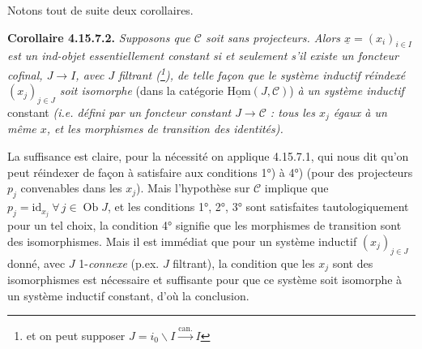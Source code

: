 \documentclass[11pt]{article}
\newcommand{\msp}[1]{\marginpar{\footnotesize [#1]}}
\newcommand{\ux}{\underline{x}}
\newcommand{\cC}{\mathcal{C}}
\newcommand{\Ob}{\operatorname{Ob}}
\newcommand{\id}{\mathrm{id}}
\begin{document}
\msp{page 442}
Notons tout de suite deux corollaires.

\textbf{Corollaire 4.15.7.2.} \textit{Supposons que $\cC$ soit sans projecteurs. Alors $\ux = (x_i)_{i\in I}$ est un ind-objet essentiellement constant si et seulement s'il existe un foncteur cofinal, $J \longrightarrow I$, avec $J$ filtrant (\footnote{et on peut supposer $J = i_0\backslash I \xrightarrow{\text{can.}} I$}), de telle façon que le système inductif réindexé $(x_j)_{j\in J}$ soit isomorphe} (dans la catégorie $\underline{\mathrm{Hom}}(J,\cC)$) \textit{à un système inductif} constant \textit{(i.e. défini par un foncteur constant $J \longrightarrow \cC$ : tous les $x_j$ égaux à un même $x$, et les morphismes de transition des identités).}

La suffisance est claire, pour la nécessité on applique 4.15.7.1, qui nous dit qu'on peut réindexer de façon à satisfaire aux conditions 1°) à 4°) (pour des projecteurs $p_j$ convenables dans les $x_j$). Mais l'hypothèse sur $\cC$ implique que $p_j = \id_{x_j}\ \forall\, j \in \Ob J$, et les conditions 1°, 2°, 3° sont satisfaites tautologiquement pour un tel choix, la condition 4° signifie que les morphismes de transition sont des isomorphismes. Mais il est immédiat que pour un système inductif $(x_j)_{j\in J}$ donné, avec $J$ 1-\textit{connexe} (p.ex. $J$ filtrant), la condition que les $x_j$ sont des isomorphismes %
est nécessaire et suffisante pour que ce système soit isomorphe à un système inductif constant, d'où la conclusion.
\end{document}
